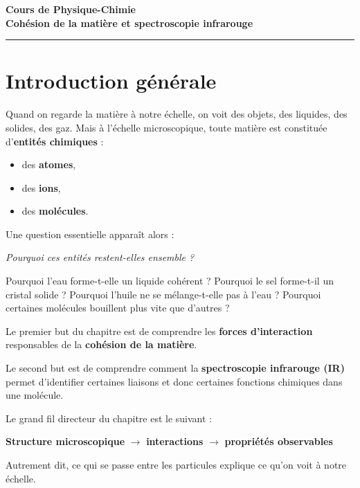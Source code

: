 \documentclass[11pt,a4paper]{article}
\begin{document}
\begin{center}
    {\LARGE \textbf{Cours de Physique-Chimie}}\\[0.3em]
    {\Large \textbf{Cohésion de la matière et spectroscopie infrarouge}}\\[0.7em]
    \rule{0.9\linewidth}{0.6pt}
\end{center}

\tableofcontents
\vspace{1em}

\section{Introduction générale}

Quand on regarde la matière à notre échelle, on voit des objets, des liquides, des solides, des gaz.  
Mais à l’échelle microscopique, toute matière est constituée d’\textbf{entités chimiques} :
\begin{itemize}
    \item des \textbf{atomes},
    \item des \textbf{ions},
    \item des \textbf{molécules}.
\end{itemize}

Une question essentielle apparaît alors :

\begin{center}
\textit{Pourquoi ces entités restent-elles ensemble ?}
\end{center}

Pourquoi l’eau forme-t-elle un liquide cohérent ?  
Pourquoi le sel forme-t-il un cristal solide ?  
Pourquoi l’huile ne se mélange-t-elle pas à l’eau ?  
Pourquoi certaines molécules bouillent plus vite que d’autres ?

Le premier but du chapitre est de comprendre les \textbf{forces d’interaction} responsables de la \textbf{cohésion de la matière}.  

Le second but est de comprendre comment la \textbf{spectroscopie infrarouge (IR)} permet d’identifier certaines liaisons et donc certaines fonctions chimiques dans une molécule.

\begin{ideebox}
Le grand fil directeur du chapitre est le suivant :

\begin{center}
\textbf{Structure microscopique} \(\longrightarrow\) \textbf{interactions} \(\longrightarrow\) \textbf{propriétés observables}
\end{center}

Autrement dit, ce qui se passe entre les particules explique ce qu’on voit à notre échelle.
\end{ideebox}
\end{document}
